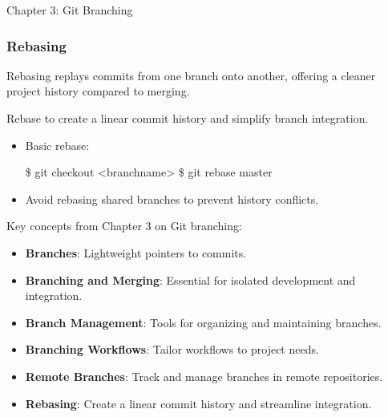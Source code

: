 \begin{notes}{Chapter 3: Git Branching}
\begin{highlight}
    \end{highlight}
    
    \subsubsection*{Rebasing}
    
    Rebasing replays commits from one branch onto another, offering a cleaner project history compared to merging.
    
    \begin{highlight}[Rebasing]
    
        Rebase to create a linear commit history and simplify branch integration.
        
        \begin{itemize}
            \item Basic rebase:
    \begin{code}[Bash]
    \$ git checkout <branchname>
    \$ git rebase master
    \end{code}
            \item Avoid rebasing shared branches to prevent history conflicts.
        \end{itemize}
    
    \end{highlight}
    
    \begin{highlight}
    
        Key concepts from Chapter 3 on Git branching:
        
        \begin{itemize}
            \item \textbf{Branches}: Lightweight pointers to commits.
            \item \textbf{Branching and Merging}: Essential for isolated development and integration.
            \item \textbf{Branch Management}: Tools for organizing and maintaining branches.
            \item \textbf{Branching Workflows}: Tailor workflows to project needs.
            \item \textbf{Remote Branches}: Track and manage branches in remote repositories.
            \item \textbf{Rebasing}: Create a linear commit history and streamline integration.
        \end{itemize}
        
    \end{highlight}
\end{notes}